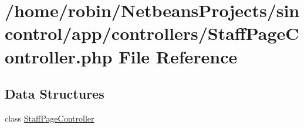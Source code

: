 \hypertarget{_staff_page_controller_8php}{}\section{/home/robin/\+Netbeans\+Projects/sincontrol/app/controllers/\+Staff\+Page\+Controller.php File Reference}
\label{_staff_page_controller_8php}
\subsection*{Data Structures}
\begin{DoxyCompactItemize}
\item 
class \hyperlink{class_staff_page_controller}{Staff\+Page\+Controller}
\end{DoxyCompactItemize}
